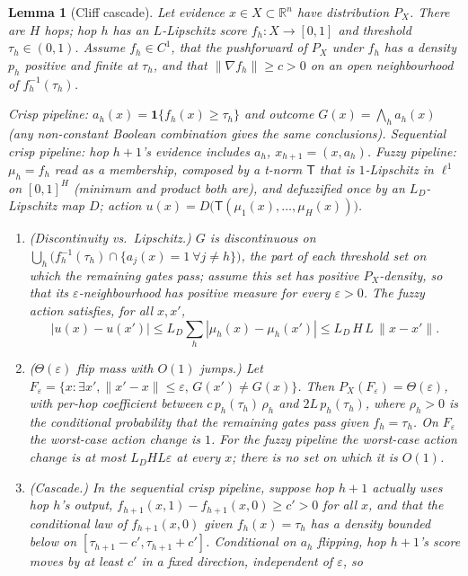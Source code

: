 \documentclass[11pt,a4paper]{article}
\numberwithin{equation}{section}
\theoremstyle{plain}
\newtheorem{lemma}{Lemma}
\theoremstyle{definition}
\theoremstyle{remark}
\newcommand{\R}{\mathbb{R}}
\newcommand{\ind}[1]{\mathbf{1}\{#1\}}
\newcommand{\norm}[1]{\lVert #1 \rVert}
\begin{document}
\begin{lemma}[Cliff cascade]\label{lem:cliff}
Let evidence $x\in X\subset\R^n$ have distribution $P_X$. There are $H$ hops; hop $h$ has an $L$-Lipschitz score $f_h:X\to[0,1]$ and threshold $\tau_h\in(0,1)$. Assume $f_h\in C^1$, that the pushforward of $P_X$ under $f_h$ has a density $p_h$ positive and finite at $\tau_h$, and that $\norm{\nabla f_h}\ge c>0$ on an open neighbourhood of $f_h^{-1}(\tau_h)$.

\emph{Crisp pipeline:} $a_h(x)=\ind{f_h(x)\ge\tau_h}$ and outcome $G(x)=\bigwedge_h a_h(x)$ (any non-constant Boolean combination gives the same conclusions). \emph{Sequential crisp pipeline:} hop $h{+}1$'s evidence includes $a_h$, $x_{h+1}=(x,a_h)$. \emph{Fuzzy pipeline:} $\mu_h=f_h$ read as a membership, composed by a t-norm $\mathsf T$ that is $1$-Lipschitz in $\ell^1$ on $[0,1]^H$ (minimum and product both are), and defuzzified once by an $L_D$-Lipschitz map $D$; action $u(x)=D\bigl(\mathsf T(\mu_1(x),\dots,\mu_H(x))\bigr)$.
\begin{enumerate}[label=(\roman*),leftmargin=2em]
\item \textup{(Discontinuity vs.\ Lipschitz.)} $G$ is discontinuous on $\bigcup_h\bigl(f_h^{-1}(\tau_h)\cap\{a_j(x)=1\ \forall j\ne h\}\bigr)$, the part of each threshold set on which the remaining gates pass; assume this set has positive $P_X$-density, so that its $\varepsilon$-neighbourhood has positive measure for every $\varepsilon>0$. The fuzzy action satisfies, for all $x,x'$,
\begin{equation}\label{eq:lip}
|u(x)-u(x')| \le L_D\sum_h|\mu_h(x)-\mu_h(x')| \le L_D\,H\,L\,\norm{x-x'} .
\end{equation}
\item \textup{($\Theta(\varepsilon)$ flip mass with $O(1)$ jumps.)} Let $F_\varepsilon=\{x:\exists x',\norm{x'-x}\le\varepsilon,\,G(x')\ne G(x)\}$. Then $P_X(F_\varepsilon)=\Theta(\varepsilon)$, with per-hop coefficient between $c\,p_h(\tau_h)\,\rho_h$ and $2L\,p_h(\tau_h)$, where $\rho_h>0$ is the conditional probability that the remaining gates pass given $f_h=\tau_h$. On $F_\varepsilon$ the worst-case action change is $1$. For the fuzzy pipeline the worst-case action change is at most $L_DHL\varepsilon$ at \emph{every} $x$; there is no set on which it is $O(1)$.
\item \textup{(Cascade.)} In the sequential crisp pipeline, suppose hop $h{+}1$ actually uses hop $h$'s output, $f_{h+1}(x,1)-f_{h+1}(x,0)\ge c'>0$ for all $x$, and that the conditional law of $f_{h+1}(x,0)$ given $f_h(x)=\tau_h$ has a density bounded below on $[\tau_{h+1}-c',\tau_{h+1}+c']$. Conditional on $a_h$ flipping, hop $h{+}1$'s score moves by at least $c'$ in a fixed direction, independent of $\varepsilon$, so

\end{enumerate}
\end{lemma}
\end{document}
